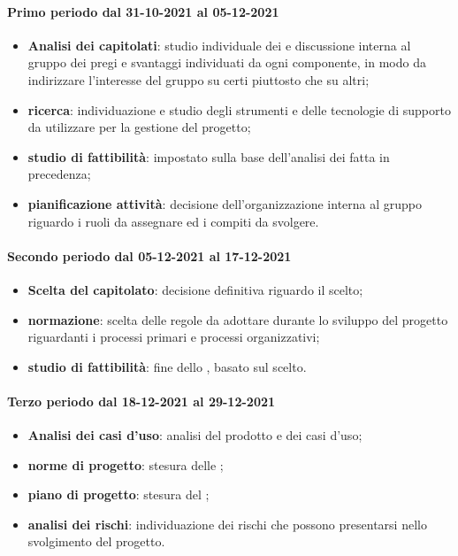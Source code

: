 \paragraph{Primo periodo dal 31-10-2021 al 05-12-2021} 
\begin{itemize} 
	\item \textbf{Analisi dei capitolati}: studio individuale dei  e discussione interna al gruppo dei pregi e svantaggi individuati da ogni componente, in modo da indirizzare l’interesse del gruppo su certi  piuttosto che su altri; 
	\item \textbf{ricerca}: individuazione e studio degli strumenti e delle tecnologie di supporto da utilizzare per la gestione del progetto; 
	\item \textbf{studio di fattibilità}: impostato sulla base dell'analisi dei  fatta in precedenza; 
	\item \textbf{pianificazione attività}: decisione dell'organizzazione interna al gruppo riguardo i ruoli da assegnare ed i compiti da svolgere. 
\end{itemize} 

\paragraph{Secondo periodo dal 05-12-2021 al 17-12-2021} 
\begin{itemize} 
	\item \textbf{Scelta del capitolato}: decisione definitiva riguardo il  scelto; 
	\item \textbf{normazione}: scelta delle regole da adottare durante lo sviluppo del progetto riguardanti i 
	processi primari e processi organizzativi; 
	\item \textbf{studio di fattibilità}: fine dello , basato sul  scelto. 
\end{itemize} 

\paragraph{Terzo periodo dal 18-12-2021 al 29-12-2021} 
\begin{itemize} 
	\item \textbf{Analisi dei casi d'uso}: analisi del prodotto e dei casi d’uso; 
	\item \textbf{norme di progetto}: stesura delle ; 
	\item \textbf{piano di progetto}: stesura del ; 
	\item \textbf{analisi dei rischi}: individuazione dei rischi che possono presentarsi nello svolgimento del progetto. 
\end{itemize} 

